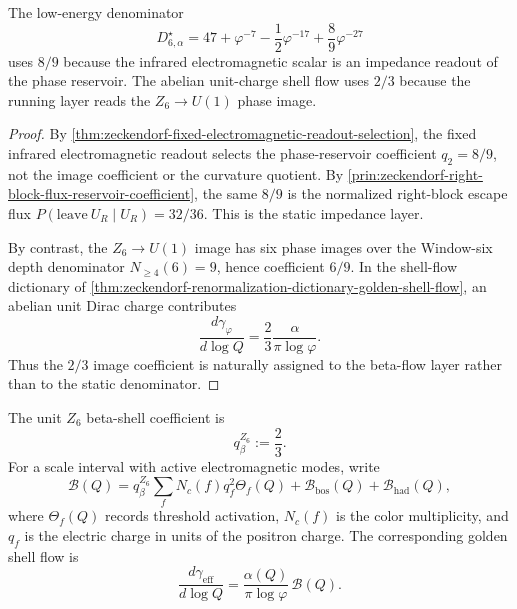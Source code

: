 \begin{theorem}
\label{thm:zeckendorf-static-impedance-beta-flow-coefficient-split}
The low-energy denominator
$$
  D_{6,\alpha}^{\star}
  =
  47+\varphi^{-7}-\frac12\varphi^{-17}
  +\frac89\varphi^{-27}
$$
uses $8/9$ because the infrared electromagnetic scalar is an impedance
readout of the phase reservoir. The abelian unit-charge shell flow uses
$2/3$ because the running layer reads the $Z_6\to U(1)$ phase image.
\end{theorem}
\begin{proof}
By
\autoref{thm:zeckendorf-fixed-electromagnetic-readout-selection}, the
fixed infrared electromagnetic readout selects the phase-reservoir
coefficient $q_2=8/9$, not the image coefficient or the curvature
quotient. By
\autoref{prin:zeckendorf-right-block-flux-reservoir-coefficient}, the
same $8/9$ is the normalized right-block escape flux
$P(\mathrm{leave}\ U_R\mid U_R)=32/36$. This is the static impedance
layer.

By contrast, the $Z_6\to U(1)$ image has six phase images over the
Window-six depth denominator $N_{\geq4}(6)=9$, hence coefficient $6/9$.
In the shell-flow dictionary of
\autoref{thm:zeckendorf-renormalization-dictionary-golden-shell-flow},
an abelian unit Dirac charge contributes
$$
  \frac{d\gamma_\varphi}{d\log Q}
  =
  \frac{2}{3}
  \frac{\alpha}{\pi\log\varphi}.
$$
Thus the $2/3$ image coefficient is naturally assigned to the beta-flow
layer rather than to the static denominator.
\end{proof}

\begin{definition}
\label{def:zeckendorf-window-six-beta-shell-coefficient}
The unit $Z_6$ beta-shell coefficient is
$$
  q_{\beta}^{Z_6}:=\frac23.
$$
For a scale interval with active electromagnetic modes, write
$$
  \mathcal{B}(Q)
  =
  q_{\beta}^{Z_6}
  \sum_f N_c(f)q_f^2\Theta_f(Q)
  +
  \mathcal{B}_{\mathrm{bos}}(Q)
  +
  \mathcal{B}_{\mathrm{had}}(Q),
$$
where $\Theta_f(Q)$ records threshold activation, $N_c(f)$ is the color
multiplicity, and $q_f$ is the electric charge in units of the
positron charge. The corresponding golden shell flow is
$$
  \frac{d\gamma_{\mathrm{eff}}}{d\log Q}
  =
  \frac{\alpha(Q)}{\pi\log\varphi}\,
  \mathcal{B}(Q).
$$
\end{definition}


